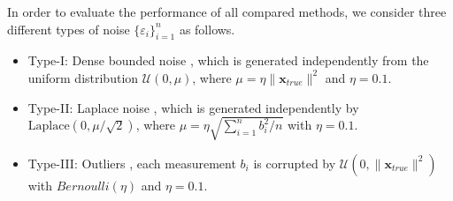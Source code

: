 \documentclass{article}
\numberwithin{equation}{section}
\begin{document}
In order to evaluate the performance of all compared methods, we consider three different types of noise $\{\varepsilon_i\}_{i=1}^n$ as follows.
\begin{itemize}
  \item Type-I: Dense bounded noise \cite{ZhangHuishuai2018Median}, which is generated independently from the uniform distribution $\mathcal{U}(0,\mu)$, where $\mu=\eta\|\mathbf{x}_{true}\|^2$ and $\eta=0.1$.
  \item Type-II: Laplace noise \cite{weller15}, which is generated independently by $\mathrm{Laplace}(0,\mu/\sqrt{2})$, where $\mu=\eta\sqrt{\sum_{i=1}^nb_i^2/n}$ with $\eta=0.1$.
  \item Type-III: Outliers \cite{2021Median}, each measurement $b_i$ is corrupted by $\mathcal{U}(0,\|\mathbf{x}_{true}\|^2)$ with $Bernoulli(\eta)$ and $\eta=0.1$.
\end{itemize}


	
\end{document}
